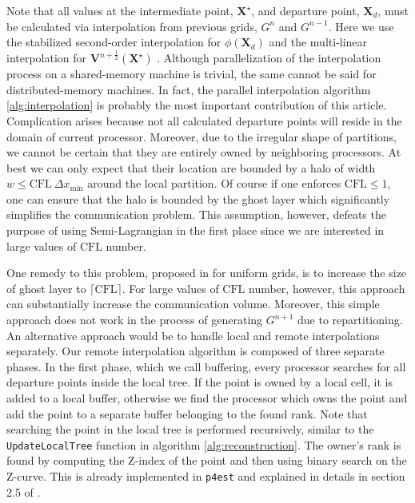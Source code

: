 Note that all values at the intermediate point, $\mathbf{X}^\star$, and departure point, $\mathbf{X}_d$, must be calculated via interpolation from previous grids, $G^{n}$ and $G^{n-1}$. Here we use the stabilized second-order interpolation for $\phi(\mathbf{X}_d)$ and the multi-linear interpolation for $\mathbf{V}^{n+\frac{1}{2}}(\mathbf{X}^\star)$ \cite{Min;Gibou:07:A-second-order-accur}. Although parallelization of the interpolation process on a shared-memory machine is trivial, the same cannot be said for distributed-memory machines. In fact, the parallel interpolation algorithm \ref{alg:interpolation} is probably the most important contribution of this article. Complication arises because not all calculated departure points will reside in the domain of current processor. Moreover, due to the irregular shape of partitions, we cannot be certain that they are entirely owned by neighboring processors. At best we can only expect that their location are bounded by a halo of width $w \le \text{CFL} \: \Delta x_{\min}$ around the local partition. Of course if one enforces $\text{CFL} \le 1$, one can ensure that the halo is bounded by the ghost layer which significantly simplifies the communication problem. This assumption, however, defeats the purpose of using Semi-Lagrangian in the first place since we are interested in large values of $\text{CFL}$ number.

One remedy to this problem, proposed in \cite{Thomas;Cote:95:Massively-parallel-s} for uniform grids, is to increase the size of ghost layer to $\lceil \text{CFL} \rceil$. For large values of $\text{CFL}$ number, however, this approach can substantially increase the communication volume. Moreover, this simple approach does not work in the process of generating $G^{n+1}$ due to repartitioning. An alternative approach would be to handle local and remote interpolations separately. Our remote interpolation algorithm is composed of three separate phases. In the first phase, which we call buffering, every processor searches for all departure points inside the local tree. If the point is owned by a local cell, it is added to a local buffer, otherwise we find the processor which owns the point and add the point to a separate buffer belonging to the found rank. Note that searching the point in the local tree is performed recursively, similar to the \texttt{UpdateLocalTree} function in algorithm \ref{alg:reconstruction}. The owner's rank is found by computing the Z-index of the point and then using binary search on the Z-curve. This is already implemented in \texttt{p4est} and explained in details in section 2.5 of \cite{Burstedde;Wilcox;Ghattas:11:p4est:-Scalable-Algo}.

